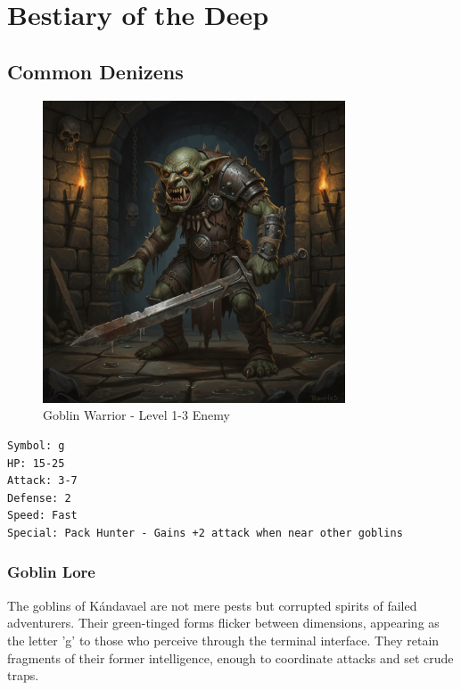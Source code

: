 \documentclass[11pt,a4paper]{book}
\begin{document}
\chapter{Bestiary of the Deep}

\section{Common Denizens}

\begin{figure}[H]
    \centering
    \includegraphics[width=0.8\textwidth]{images/goblin-warrior.png}
    \caption{Goblin Warrior - Level 1-3 Enemy}
\end{figure}

\begin{mechanicsbox}
\begin{verbatim}
Symbol: g
HP: 15-25
Attack: 3-7
Defense: 2
Speed: Fast
Special: Pack Hunter - Gains +2 attack when near other goblins
\end{verbatim}
\end{mechanicsbox}

\subsection{Goblin Lore}

The goblins of Kándavael are not mere pests but corrupted spirits of failed adventurers. Their green-tinged forms flicker between dimensions, appearing as the letter 'g' to those who perceive through the terminal interface. They retain fragments of their former intelligence, enough to coordinate attacks and set crude traps.
\end{document}
